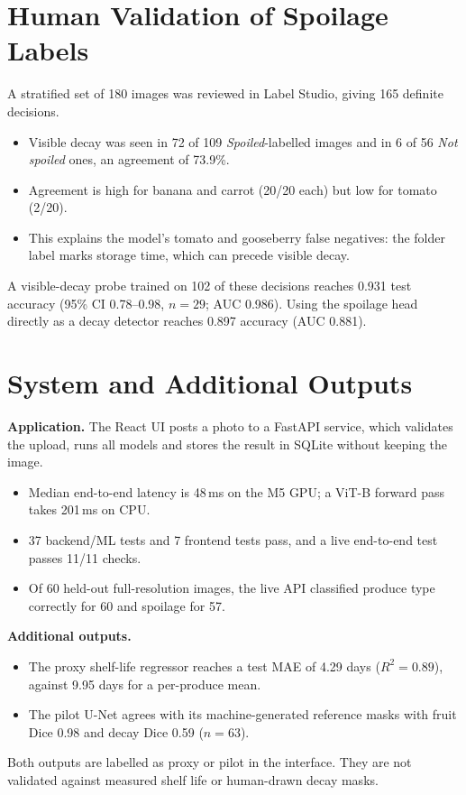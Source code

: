 \documentclass[conference]{IEEEtran}
\begin{document}
\section{Human Validation of Spoilage Labels}\label{sec:human}
A stratified set of 180 images was reviewed in Label Studio, giving 165 definite decisions.
\begin{itemize}
\item Visible decay was seen in 72 of 109 \emph{Spoiled}-labelled images and in 6 of 56 \emph{Not spoiled} ones, an agreement of 73.9\%.
\item Agreement is high for banana and carrot (20/20 each) but low for tomato (2/20).
\item This explains the model's tomato and gooseberry false negatives: the folder label marks storage time, which can precede visible decay.
\end{itemize}
A visible-decay probe trained on 102 of these decisions reaches 0.931 test accuracy (95\% CI 0.78--0.98, $n=29$; AUC 0.986). Using the spoilage head directly as a decay detector reaches 0.897 accuracy (AUC 0.881).

\section{System and Additional Outputs}
\textbf{Application.} The React UI posts a photo to a FastAPI service, which validates the upload, runs all models and stores the result in SQLite without keeping the image.
\begin{itemize}
\item Median end-to-end latency is 48\,ms on the M5 GPU; a ViT-B forward pass takes 201\,ms on CPU.
\item 37 backend/ML tests and 7 frontend tests pass, and a live end-to-end test passes 11/11 checks.
\item Of 60 held-out full-resolution images, the live API classified produce type correctly for 60 and spoilage for 57.
\end{itemize}

\textbf{Additional outputs.}
\begin{itemize}
\item The proxy shelf-life regressor reaches a test MAE of 4.29 days ($R^2=0.89$), against 9.95 days for a per-produce mean.
\item The pilot U-Net agrees with its machine-generated reference masks with fruit Dice 0.98 and decay Dice 0.59 ($n=63$).
\end{itemize}
Both outputs are labelled as proxy or pilot in the interface. They are not validated against measured shelf life or human-drawn decay masks.
\end{document}
